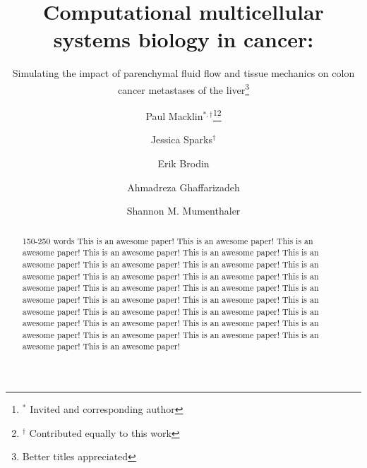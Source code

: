 \documentclass[smallextended,natbib]{svjour3}
\begin{document}
\title{Computational multicellular systems biology in cancer:}
\subtitle{Simulating the impact of parenchymal fluid flow and tissue mechanics on colon cancer metastases of the liver\footnote{Better titles appreciated}}
\dedication{Dedicated to all the papers we should have written.}

\author{Paul Macklin${}^{*,\dagger}$\thanks{${}^{*}$ Invited and corresponding author}\thanks{${}^{\dagger}$ Contributed equally to this work} \and Jessica Sparks${}^{\dagger}$ 
\and Erik Brodin 
\and Ahmadreza Ghaffarizadeh  \and Shannon M. Mumenthaler}


\maketitle


\begin{abstract}150-250 words
This is an awesome paper! 
This is an awesome paper! 
This is an awesome paper! 
This is an awesome paper! 
This is an awesome paper! 
This is an awesome paper! 
This is an awesome paper! 
This is an awesome paper! 
This is an awesome paper! 
This is an awesome paper! 
This is an awesome paper! 
This is an awesome paper! 
This is an awesome paper! 
This is an awesome paper! 
This is an awesome paper! 
This is an awesome paper! 
This is an awesome paper! 
This is an awesome paper! 
This is an awesome paper! 
This is an awesome paper! 
This is an awesome paper! 
This is an awesome paper! 
This is an awesome paper! 
This is an awesome paper! 
This is an awesome paper! 
This is an awesome paper! 
This is an awesome paper! 
This is an awesome paper! 
\end{abstract}
\end{document}
